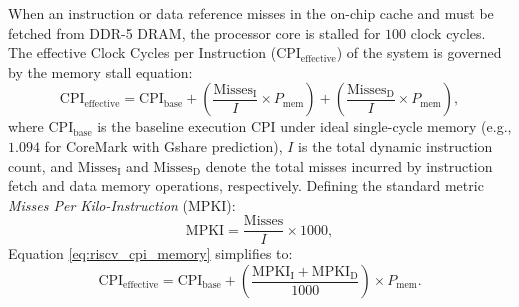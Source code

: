 When an instruction or data reference misses in the on-chip cache and must be fetched from DDR-5 DRAM, the processor core is stalled for $100$ clock cycles. The effective Clock Cycles per Instruction ($\text{CPI}_{\text{effective}}$) of the system is governed by the memory stall equation:
\begin{equation}\label{eq:riscv_cpi_memory}
\text{CPI}_{\text{effective}} = \text{CPI}_{\text{base}} + \left(\frac{\text{Misses}_{\text{I}}}{I} \times P_{\text{mem}}\right) + \left(\frac{\text{Misses}_{\text{D}}}{I} \times P_{\text{mem}}\right),
\end{equation}
where $\text{CPI}_{\text{base}}$ is the baseline execution CPI under ideal single-cycle memory (e.g., $1.094$ for CoreMark with Gshare prediction), $I$ is the total dynamic instruction count, and $\text{Misses}_{\text{I}}$ and $\text{Misses}_{\text{D}}$ denote the total misses incurred by instruction fetch and data memory operations, respectively. Defining the standard metric \textit{Misses Per Kilo-Instruction} ($\text{MPKI}$):
\begin{equation}
\text{MPKI} = \frac{\text{Misses}}{I} \times 1000,
\end{equation}
Equation \ref{eq:riscv_cpi_memory} simplifies to:
\begin{equation}\label{eq:riscv_cpi_mpki}
\text{CPI}_{\text{effective}} = \text{CPI}_{\text{base}} + \left(\frac{\text{MPKI}_{\text{I}} + \text{MPKI}_{\text{D}}}{1000}\right) \times P_{\text{mem}}.
\end{equation}

